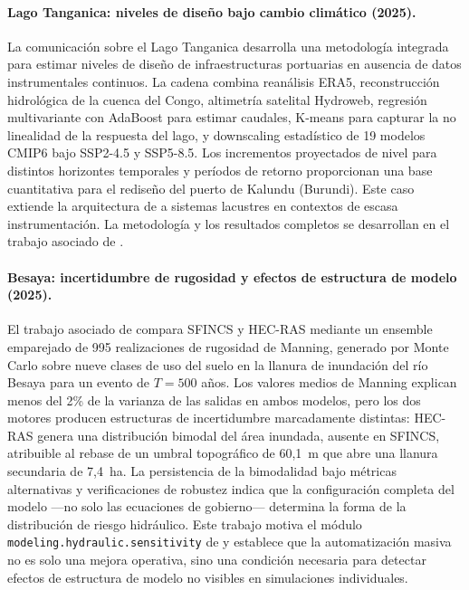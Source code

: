 \paragraph{Lago Tanganica: niveles de diseño bajo cambio climático (2025).}
La comunicación sobre el Lago Tanganica \parencite{navas2025tanganika} desarrolla una metodología integrada para estimar niveles de diseño de infraestructuras portuarias en ausencia de datos instrumentales continuos. La cadena combina reanálisis ERA5, reconstrucción hidrológica de la cuenca del Congo, altimetría satelital Hydroweb, regresión multivariante con AdaBoost para estimar caudales, K-means para capturar la no linealidad de la respuesta del lago, y downscaling estadístico de 19 modelos CMIP6 bajo SSP2-4.5 y SSP5-8.5. Los incrementos proyectados de nivel para distintos horizontes temporales y períodos de retorno proporcionan una base cuantitativa para el rediseño del puerto de Kalundu (Burundi). Este caso extiende la arquitectura de \hydra a sistemas lacustres en contextos de escasa instrumentación. La metodología y los resultados completos se desarrollan en el trabajo asociado de \textcite{navas2025tanganicaIA}.

\paragraph{Besaya: incertidumbre de rugosidad y efectos de estructura de modelo (2025).}
El trabajo asociado de \textcite{navas2025roughness} compara SFINCS y HEC-RAS mediante un ensemble emparejado de 995 realizaciones de rugosidad de Manning, generado por Monte Carlo sobre nueve clases de uso del suelo en la llanura de inundación del río Besaya para un evento de $T = 500$ años. Los valores medios de Manning explican menos del 2\% de la varianza de las salidas en ambos modelos, pero los dos motores producen estructuras de incertidumbre marcadamente distintas: HEC-RAS genera una distribución bimodal del área inundada, ausente en SFINCS, atribuible al rebase de un umbral topográfico de 60,1~m que abre una llanura secundaria de 7,4~ha. La persistencia de la bimodalidad bajo métricas alternativas y verificaciones de robustez indica que la configuración completa del modelo ---no solo las ecuaciones de gobierno--- determina la forma de la distribución de riesgo hidráulico. Este trabajo motiva el módulo \texttt{modeling.hydraulic.sensitivity} de \hydra y establece que la automatización masiva no es solo una mejora operativa, sino una condición necesaria para detectar efectos de estructura de modelo no visibles en simulaciones individuales.


